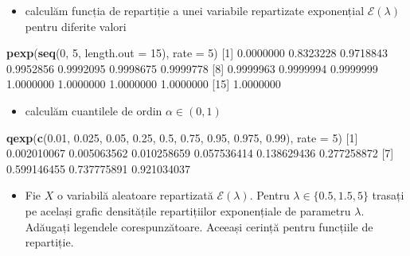 \documentclass[]{article}
\newenvironment{Shaded}{\begin{snugshade}}{\end{snugshade}}
\newcommand{\KeywordTok}[1]{\textcolor[rgb]{0.13,0.29,0.53}{\textbf{#1}}}
\newcommand{\DataTypeTok}[1]{\textcolor[rgb]{0.13,0.29,0.53}{#1}}
\newcommand{\DecValTok}[1]{\textcolor[rgb]{0.00,0.00,0.81}{#1}}
\newcommand{\FloatTok}[1]{\textcolor[rgb]{0.00,0.00,0.81}{#1}}
\newcommand{\NormalTok}[1]{#1}
\providecommand{\tightlist}{%
  \setlength{\itemsep}{0pt}\setlength{\parskip}{0pt}}
\newenvironment{frshaded*}{%
  \def\FrameCommand{\fboxrule=\FrameRule\fboxsep=\FrameSep \fcolorbox{framecolor}{shadecolor1}}%
  \MakeFramed {\advance\hsize-\width \FrameRestore}}%
{\endMakeFramed}
\newenvironment{rmdblock}[1]
  {\begin{frshaded*}
  \begin{itemize}
  \renewcommand{\labelitemi}{
    \raisebox{-.7\height}[0pt][0pt]{
      {\setkeys{Gin}{width=2em,keepaspectratio}\texttt{[image: images/icons/\#1]}}
    }
  }
  \item
  }
  {
  \end{itemize}
  \end{frshaded*}
  }
\newenvironment{rmdexercise}
  {\begin{rmdblock}{exercise}}
  {\end{rmdblock}}
\begin{document}
\begin{itemize}
\tightlist
\item
  calculăm funcția de repartiție a unei variabile repartizate
  exponențial \(\mathcal{E}(\lambda)\) pentru diferite valori
\end{itemize}

\begin{Shaded}
\begin{Highlighting}[]
\KeywordTok{pexp}\NormalTok{(}\KeywordTok{seq}\NormalTok{(}\DecValTok{0}\NormalTok{, }\DecValTok{5}\NormalTok{, }\DataTypeTok{length.out =} \DecValTok{15}\NormalTok{), }\DataTypeTok{rate =} \DecValTok{5}\NormalTok{)}
\NormalTok{ [}\DecValTok{1}\NormalTok{] }\FloatTok{0.0000000} \FloatTok{0.8323228} \FloatTok{0.9718843} \FloatTok{0.9952856} \FloatTok{0.9992095} \FloatTok{0.9998675} \FloatTok{0.9999778}
\NormalTok{ [}\DecValTok{8}\NormalTok{] }\FloatTok{0.9999963} \FloatTok{0.9999994} \FloatTok{0.9999999} \FloatTok{1.0000000} \FloatTok{1.0000000} \FloatTok{1.0000000} \FloatTok{1.0000000}
\NormalTok{[}\DecValTok{15}\NormalTok{] }\FloatTok{1.0000000}
\end{Highlighting}
\end{Shaded}

\begin{itemize}
\tightlist
\item
  calculăm cuantilele de ordin \(\alpha\in(0,1)\)
\end{itemize}

\begin{Shaded}
\begin{Highlighting}[]
\KeywordTok{qexp}\NormalTok{(}\KeywordTok{c}\NormalTok{(}\FloatTok{0.01}\NormalTok{, }\FloatTok{0.025}\NormalTok{, }\FloatTok{0.05}\NormalTok{, }\FloatTok{0.25}\NormalTok{, }\FloatTok{0.5}\NormalTok{, }\FloatTok{0.75}\NormalTok{, }\FloatTok{0.95}\NormalTok{, }\FloatTok{0.975}\NormalTok{, }\FloatTok{0.99}\NormalTok{), }\DataTypeTok{rate =} \DecValTok{5}\NormalTok{)}
\NormalTok{[}\DecValTok{1}\NormalTok{] }\FloatTok{0.002010067} \FloatTok{0.005063562} \FloatTok{0.010258659} \FloatTok{0.057536414} \FloatTok{0.138629436} \FloatTok{0.277258872}
\NormalTok{[}\DecValTok{7}\NormalTok{] }\FloatTok{0.599146455} \FloatTok{0.737775891} \FloatTok{0.921034037}
\end{Highlighting}
\end{Shaded}

\begin{rmdexercise}
Fie \(X\) o variabilă aleatoare repartizată \(\mathcal{E}(\lambda)\).
Pentru \(\lambda \in \{0.5, 1.5, 5\}\) trasați pe același grafic
densitățile repartițiilor exponențiale de parametru \(\lambda\).
Adăugați legendele corespunzătoare. Aceeași cerință pentru funcțiile de
repartiție.
\end{rmdexercise}
\end{document}
